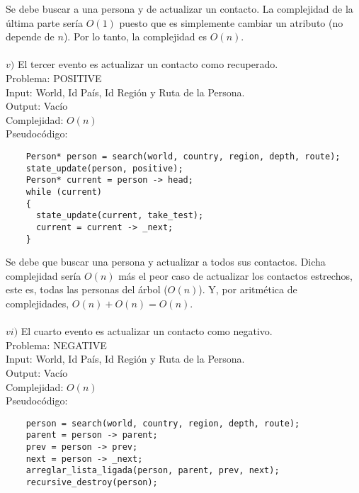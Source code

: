 \documentclass[letter]{article}
\begin{document}
\begin{parte}{1}
	Se debe buscar a una persona y de actualizar un contacto. La complejidad de la última parte sería $O(1)$ puesto que es simplemente cambiar un atributo (no depende de $n$). Por lo tanto, la complejidad es $O(n)$.\\\\
	
	\noindent
	$v)$ El tercer evento es actualizar un contacto como recuperado.\\
	
	\noindent
	Problema: POSITIVE\\
	Input: World, Id País, Id Región y Ruta de la Persona.\\
	Output: Vacío\\
	Complejidad: $O(n)$\\
	Pseudocódigo:
	
	\begin{lstlisting}
	Person* person = search(world, country, region, depth, route);
	state_update(person, positive);
	Person* current = person -> head;
	while (current)
	{
	  state_update(current, take_test);
	  current = current -> _next;
	}
	\end{lstlisting}
	\vspace{0.2cm}
	
	Se debe que buscar una persona y actualizar a todos sus contactos. Dicha complejidad sería $O(n)$ más el peor caso de actualizar los contactos estrechos, este es, todas las personas del árbol ($O(n)$). Y, por aritmética de complejidades, $O(n) + O(n) = O(n)$.\\\\
	
	\noindent
	$vi)$ El cuarto evento es actualizar un contacto como negativo.\\
	
	\noindent
	Problema: NEGATIVE\\
	Input: World, Id País, Id Región y Ruta de la Persona.\\
	Output: Vacío\\
	Complejidad: $O(n)$\\
	Pseudocódigo:
	
	\begin{lstlisting}
	person = search(world, country, region, depth, route);
	parent = person -> parent;
	prev = person -> prev;
	next = person -> _next;
	arreglar_lista_ligada(person, parent, prev, next);
	recursive_destroy(person);
	\end{lstlisting}
	\vspace{0.2cm}
	

\end{parte}
\end{document}
